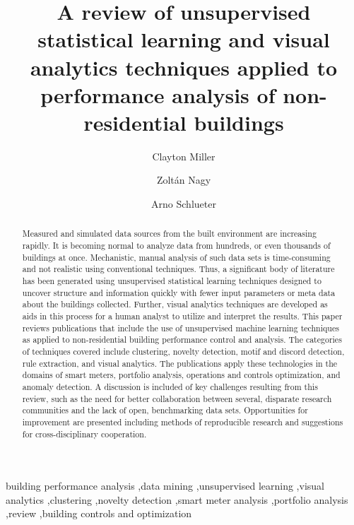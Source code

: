\documentclass[preprint,12pt,3p]{elsarticle}
\begin{document}
\begin{frontmatter}

\title{A review of unsupervised statistical learning and visual analytics techniques applied to  performance analysis of non-residential buildings}


\author{Clayton Miller}

\author{Zolt\'an Nagy}
\author{Arno Schlueter}

\address{ETH Z\"urich, Institute of Technology in Architecture (ITA), Architecture and Building Systems (A/S)}
\address{John-von-Neumann-Weg 9, Z\"urich, Switzerland} %





\begin{abstract}
Measured and simulated data sources from the built environment are increasing rapidly. It is becoming normal to analyze data from hundreds, or even thousands of buildings at once. Mechanistic, manual analysis of such data sets is time-consuming and not realistic using conventional techniques. Thus, a significant body of literature has been generated using unsupervised statistical learning techniques designed to uncover structure and information quickly with fewer input parameters or meta data about the buildings collected. Further, visual analytics techniques are developed as aids in this process for a human analyst to utilize and interpret the results. This paper reviews publications that include the use of unsupervised machine learning techniques as applied to non-residential building performance control and analysis. The categories of techniques covered include clustering, novelty detection, motif and discord detection, rule extraction, and visual analytics. The publications apply these technologies in the domains of smart meters, portfolio analysis, operations and controls optimization, and anomaly detection. A discussion is included of key challenges resulting from this review, such as the need for better collaboration between several, disparate research communities and the lack of open, benchmarking data sets. Opportunities for improvement are presented including methods of reproducible research and suggestions for cross-disciplinary cooperation.

\end{abstract}

\begin{keyword}
building performance analysis \sep data mining \sep unsupervised learning \sep visual analytics \sep clustering \sep novelty detection \sep smart meter analysis \sep portfolio analysis \sep review \sep building controls and optimization
\end{keyword}

\end{frontmatter}
\end{document}
